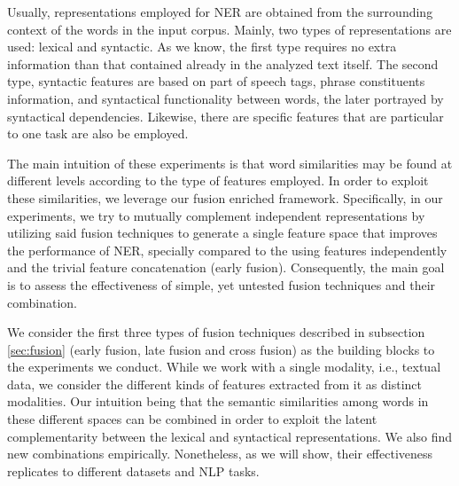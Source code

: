 Usually, representations employed for NER are obtained from the surrounding context of the words in the  input corpus. Mainly,  two types of representations are used: lexical and syntactic. As we know, the first type requires no extra information than that contained already in the analyzed text itself. The second type, syntactic features  are based on part of speech tags, phrase constituents information, and syntactical functionality between words, the later portrayed by syntactical dependencies. Likewise, there are specific features that are particular to one task are also be employed.


The main intuition of these experiments is that word similarities may be found at different levels according to the type of features employed. In order to exploit these similarities, we leverage our fusion enriched framework. Specifically, in our experiments, we try to mutually complement independent representations by utilizing said fusion techniques to generate a single feature space that improves the performance of NER, specially compared to the using features independently and the trivial feature concatenation (early fusion). Consequently, the main goal is to assess the effectiveness of simple, yet untested fusion techniques and their combination.



We consider the first three types of fusion techniques described in subsection \ref{sec:fusion} (early fusion, late fusion and cross fusion) as the building blocks to the experiments we conduct.  While we work with a single modality, i.e., textual data, we consider the different kinds of features extracted from it as distinct modalities. Our intuition being that the semantic similarities among words in these different spaces can be combined in order to exploit the latent complementarity between the lexical and syntactical representations. We also find new combinations empirically. Nonetheless, as we will show, their effectiveness replicates to different datasets and NLP tasks. 

